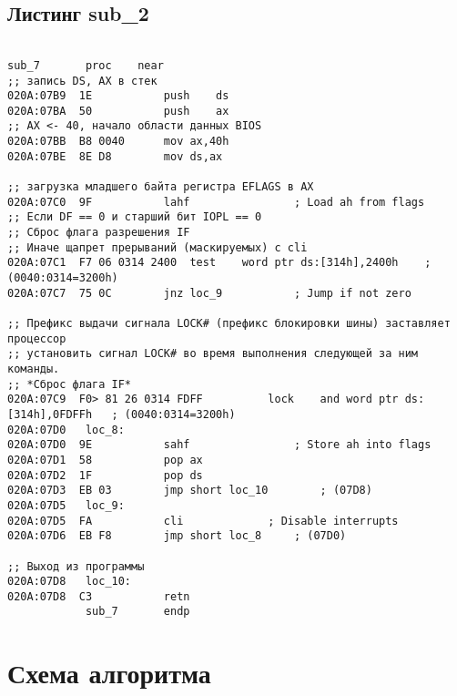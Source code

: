 \subsection*{Листинг sub\_2} 
\begin{lstlisting}[style={asm}]
 
sub_7		proc	near
;; запись DS, AX в стек
020A:07B9  1E			push	ds
020A:07BA  50			push	ax
;; AX <- 40, начало области данных BIOS
020A:07BB  B8 0040		mov	ax,40h
020A:07BE  8E D8		mov	ds,ax
	
;; загрузка младшего байта регистра EFLAGS в AX
020A:07C0  9F			lahf				; Load ah from flags
;; Если DF == 0 и старший бит IOPL == 0
;; Сброс флага разрешения IF
;; Иначе щапрет прерываний (маскируемых) с cli
020A:07C1  F7 06 0314 2400	test	word ptr ds:[314h],2400h	; (0040:0314=3200h)
020A:07C7  75 0C		jnz	loc_9			; Jump if not zero
	
;; Префикс выдачи сигнала LOCK# (префикс блокировки шины) заставляет процессор 
;; установить сигнал LOCK# во время выполнения следующей за ним команды. 
;; *Сброс флага IF*
020A:07C9  F0> 81 26 0314 FDFF          lock	and	word ptr ds:[314h],0FDFFh	; (0040:0314=3200h)
020A:07D0	loc_8:
020A:07D0  9E			sahf				; Store ah into flags
020A:07D1  58			pop	ax
020A:07D2  1F			pop	ds
020A:07D3  EB 03		jmp	short loc_10		; (07D8)
020A:07D5	loc_9:
020A:07D5  FA			cli				; Disable interrupts
020A:07D6  EB F8		jmp	short loc_8		; (07D0)

;; Выход из программы
020A:07D8	loc_10:
020A:07D8  C3			retn
			sub_7		endp
\end{lstlisting}

\clearpage

\section*{Схема алгоритма}





\clearpage


